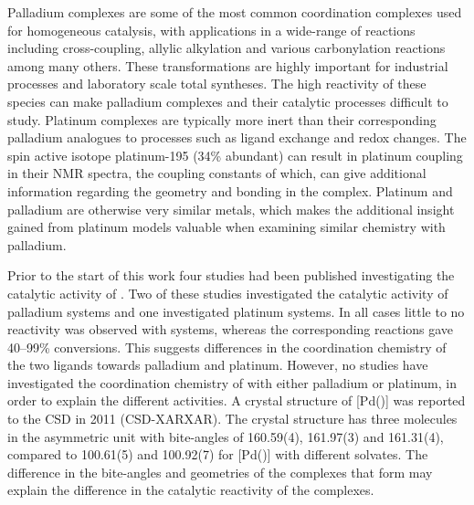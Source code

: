 Palladium complexes are some of the most common coordination complexes used for homogeneous catalysis, with applications in a wide-range of reactions including cross-coupling, allylic alkylation and various carbonylation reactions among many others.\cite{Dierkes1998, Freixa2003, Nicolaou2005, Peris2004, Shen2008, Suzuki1999, Wu2013}  These transformations are highly important for industrial processes and laboratory scale total syntheses.\cite{Simeone2010, Trost2012, Wagaw1999}  The high reactivity of these species can make palladium complexes and their catalytic processes difficult to study. Platinum complexes are typically more inert than their corresponding palladium analogues to processes such as ligand exchange and redox changes.\cite{Chianese2007}  The spin active isotope platinum-195 (34\% abundant) can result in platinum coupling in their NMR spectra, the coupling constants of which, can give additional information regarding the geometry and bonding in the complex.  Platinum and palladium are otherwise very similar metals, which makes the additional insight gained from platinum models valuable when examining similar chemistry with palladium.  

Prior to the start of this work four studies had been published investigating the catalytic activity of \tBuxantphos{}.\cite{Mispelaere2005, Dongol2007, Ohshima2009, Cabello2007}  Two of these studies investigated the catalytic activity of \tBuxantphos{} palladium systems and one investigated platinum systems.  In all cases little to no reactivity was observed with \tBuxantphos{} systems, whereas the corresponding \Phxantphos{} reactions gave 40--99\% conversions.  This suggests differences in the coordination chemistry of the two ligands towards palladium and platinum.  However, no studies have investigated the coordination chemistry of \tBuxantphos{} with either palladium or platinum, in order to explain the different activities.  A crystal structure of [Pd(\tBuxantphos)] was reported to the \gls{CSD} in 2011 (CSD-XARXAR).\cite{Allen2002}  The crystal structure has three molecules in the asymmetric unit with bite-angles of 160.59(4), 161.97(3) and 161.31(4)\degrees{}, compared to 100.61(5) and 100.92(7)\degrees{} for [Pd(\Phxantphos)] with different solvates.\cite{Allen2002,  Johns2006, Jahromi2012} The difference in the bite-angles and geometries of the complexes that form may explain the difference in the catalytic reactivity of the complexes.  

